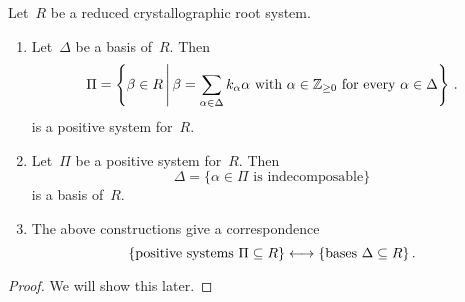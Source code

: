 \begin{proposition}
  Let~$R$ be a reduced crystallographic root system.
  \begin{enumerate}
    \item
      Let~$\Delta$ be a basis of~$R$.
      Then
      \[
        \Pi
        =
        \left\{
          \beta \in R
        \suchthat*
          \text{$\beta = \sum_{\alpha \in \Delta} k_\alpha \alpha$ with~$\alpha \in \Integer_{\geq 0}$ for every~$\alpha \in \Delta$}
        \right\} \,.
      \]
      is a positive system for~$R$.
    \item
      Let~$\Pi$ be a positive system for~$R$.
      Then
      \[
        \Delta
        =
        \{
          \text{$\alpha \in \Pi$ is indecomposable}
        \}
      \]
      is a basis of~$R$.
    \item
      The above constructions give a {\onetoone} correspondence
      \[
        \{
          \text{positive systems~$\Pi \subseteq R$}
        \}
        \longleftrightarrow
        \{
          \text{bases~$\Delta \subseteq R$}
        \} \,.
      \]
  \end{enumerate}
\end{proposition}


\begin{proof}
  We will show this later.
\end{proof}








